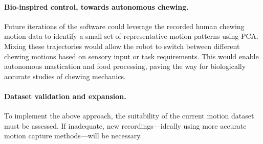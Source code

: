 \paragraph{Bio-inspired control, towards autonomous chewing.}  
Future iterations of the software could leverage the recorded human chewing motion data to identify a small set of representative motion patterns using PCA. Mixing these trajectories 
would allow the robot to switch between different chewing motions based on sensory input or task requirements. This would enable autonomous mastication and food processing, paving 
the way for biologically accurate studies of chewing mechanics.

\paragraph{Dataset validation and expansion.}  
To implement the above approach, the suitability of the current motion dataset must be assessed. If inadequate, new recordings—ideally using more accurate motion capture 
methods—will be necessary.


